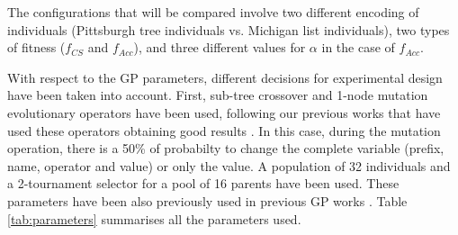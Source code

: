\documentclass[runningheads]{llncs}
\begin{document}
The configurations that will be compared involve two different encoding of individuals (Pittsburgh tree individuals vs. Michigan list individuals), two types of fitness ($f_{CS}$ and $f_{Acc}$), and three different values for $\alpha$ in the case of $f_{Acc}$.

With respect to the GP parameters, different decisions for experimental design have been taken into account. 
First, sub-tree crossover and 1-node mutation evolutionary operators have
been used, following our previous works that have used these operators
obtaining good results \cite{EvoStar2014:GPBot}. In this case, during the
mutation operation, there is a 50\% of probabilty to change the complete variable (prefix, name, operator and value) or only the value. A population of 32 individuals and a 2-tournament selector for a pool of
16 parents have been used. These parameters have been also previously used in previous GP works \cite{EvoStar2014:GPBot}. Table \ref{tab:parameters} summarises all the parameters used.
%
\begin{table}
\begin{center}
\caption{Parameters used in the experiments.}
\label{tab:parameters}
\end{center}
\end{table}
\end{document}
